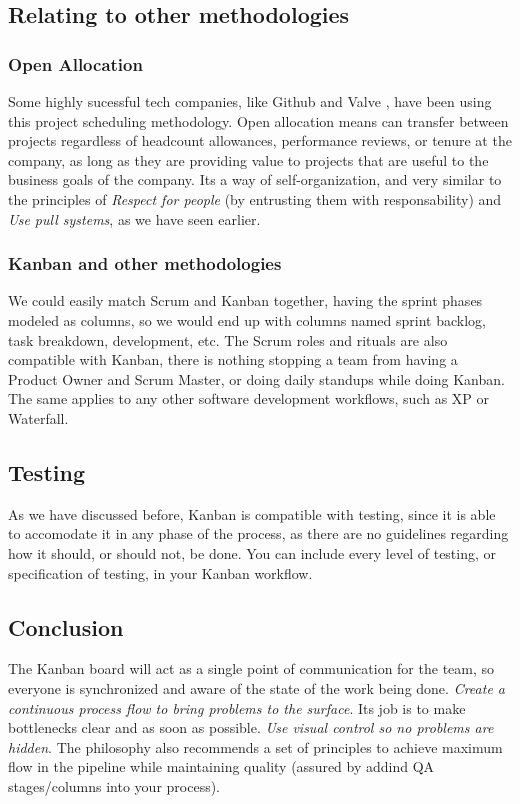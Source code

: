 \documentclass[conference]{IEEEtran}
\begin{document}
\subsection{Relating to other methodologies}
\subsubsection{Open Allocation}
Some highly sucessful tech companies, like Github and Valve \cite{openalloc}, have been using
this project scheduling methodology. Open allocation means can transfer between
projects regardless of headcount allowances, performance reviews, or tenure at
the company, as long as they are providing value to projects that are useful to
the business goals of the company. Its a way of self-organization, and very
similar to the principles of \textit{Respect for people} (by entrusting them
with responsability) and \textit{Use pull systems}, as we have seen earlier.
\subsubsection{Kanban and other methodologies}
We could easily match Scrum and Kanban together, having the sprint phases modeled
as columns, so we would end up with columns named sprint backlog, task breakdown,
development, etc. The Scrum roles and rituals are also compatible with Kanban,
there is nothing stopping a team from having a Product Owner and Scrum Master,
or doing daily standups while doing Kanban.
The same applies to any other software development workflows, such
as XP or Waterfall.

\subsection{Testing}
As we have discussed before, Kanban is compatible with testing, since it is able to
accomodate it in any phase of the process, as there are no guidelines regarding how it should, or should not, be done.
You can include every level of testing, or specification of testing, in your Kanban
workflow.

\subsection{Conclusion}
The Kanban board will act as a single point of communication for the
team, so everyone is synchronized and aware of the state of the work being done.
\textit{Create a continuous process flow to bring problems to the surface}.
Its job is to make bottlenecks clear and as soon as possible. \textit{Use visual control so no problems are hidden}.
The philosophy also recommends a set of principles to achieve maximum flow in the
pipeline while maintaining quality (assured by addind QA stages/columns into your process).
\end{document}
